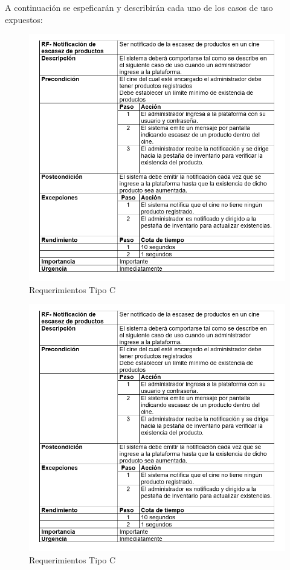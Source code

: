 A continuación se espeficarán y describirán cada uno de los casos de uso expuestos:
\begin{figure}[h!]
\centering
\includegraphics[width=.8\linewidth]{diseno/requerimientos/imgs/casos1}
	\caption{Requerimientos Tipo C}
\end{figure}
\newpage
\begin{figure}[h!]
\centering
\includegraphics[width=.8\linewidth]{diseno/requerimientos/imgs/casos1}
	\caption{Requerimientos Tipo C}
\end{figure}
\newpage
